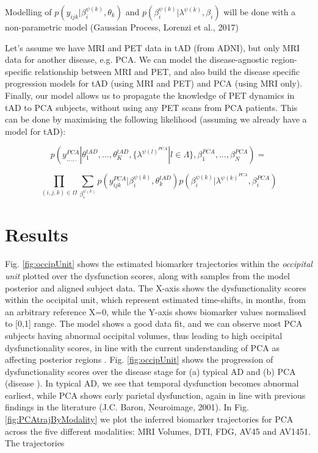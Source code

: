 \documentclass{llncs}
\begin{document}
Modelling of $p(y_{ijk}| \beta_i^{\psi(k)}, \theta_k)$ and $p(\beta_i^{\psi(k)}| \lambda^{\psi(k)}, \beta_i)$ will be done with a non-parametric model (Gaussian Process, Lorenzi et al., 2017)


Let's assume we have MRI and PET data in tAD (from ADNI), but only MRI data for another disease, e.g. PCA. We can model the disease-agnostic region-specific relationship between MRI and PET, and also build the disease specific progression models for tAD (using MRI and PET) and PCA (using MRI only). Finally, our model allows us to propagate the knowledge of PET dynamics in tAD to PCA subjects, without using any PET scans from PCA patients. This can be done by maximising the following likelihood (assuming we already have a model for tAD):

\begin{equation}
 p(y_{.,.,.}^{PCA}|\theta_1^{tAD}, ..., \theta_K^{tAD}, \{\lambda^{\psi(l)^{PCA}} | l \in \Lambda \}, \beta_1^{PCA}, ..., \beta_N^{PCA}) = 
\end{equation}

 \begin{equation}
 \prod_{(i,j,k) \in \Omega} \sum_{\beta_i^{\psi(k)}} p(y_{ijk}^{PCA}| \beta_i^{\psi(k)}, \theta_k^{tAD}) p(\beta_i^{\psi(k)}| \lambda^{\psi(k)^{PCA}}, \beta_i^{PCA})
\end{equation}

\section{Results}

Fig. \ref{fig:occipUnit} shows the estimated biomarker trajectories within the \emph{occipital unit} plotted over the dysfunction scores, along with samples from the model posterior and aligned subject data. The X-axis shows the dysfunctionality scores within the occipital unit, which represent estimated time-shifts, in months, from an arbitrary reference X=0, while the Y-axis shows biomarker values normalised to [0,1] range. The model shows a good data fit, and we can observe most PCA subjects having abnormal occipital volumes, thus leading to high occipital dysfunctionality scores, in line with the current understanding of PCA as affecting posterior regions \cite{crutch2012posterior}. Fig. \ref{fig:occipUnit} shows the progression of dysfunctionality scores over the disease stage for (a) typical AD and (b) PCA (disease ). In typical AD, we see that temporal dysfunction becomes abnormal earliest, while PCA shows early parietal dysfunction, again in line with previous findings in the literature \cite{crutch2012posterior} (J.C. Baron, Neuroimage, 2001). In Fig. \ref{fig:PCAtrajByModality} we plot the inferred biomarker trajectories for PCA across the five different modalities: MRI Volumes, DTI, FDG, AV45 and AV1451. The trajectories 
\end{document}
